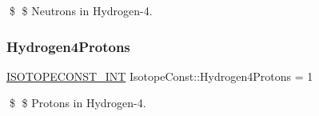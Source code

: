\$ \$ Neutrons in Hydrogen-\/4. \mbox{\label{group___isotope_const-_hydrogen-_h4_gafcdc6d6881ca92177168b7ef686c3747}} 
\subsubsection{\texorpdfstring{Hydrogen4\+Protons}{Hydrogen4Protons}}
{\footnotesize\ttfamily \mbox{\hyperlink{group___isotope_const-_macros_ga5f18360b3e99483a35c32d789e62621c}{I\+S\+O\+T\+O\+P\+E\+C\+O\+N\+S\+T\+\_\+\+I\+NT}} Isotope\+Const\+::\+Hydrogen4\+Protons = 1}

\$ \$ Protons in Hydrogen-\/4. 